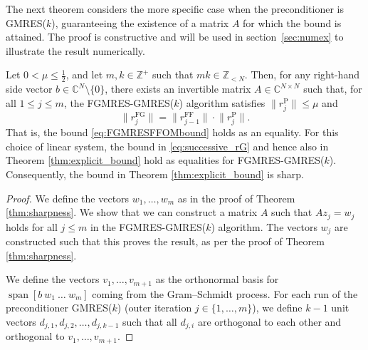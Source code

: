 \documentclass{siamart251216}
\DeclareMathOperator{\spn}{span}
\def\C{\mathbb{C}}
\def\Z{\mathbb{Z}}
\begin{document}
{The next theorem considers the more specific case when the preconditioner is GMRES($k$), guaranteeing the existence of a matrix $A$ for which the bound is attained. The proof is constructive and will be used in section~\ref{sec:numex} to illustrate the result numerically.

\begin{theorem}  \label{thm:sharpness_gmres}
    Let $0 < \mu \leq \frac{1}{2}$, and let $m,k \in \Z^+$ such that $mk \in \Z_{<N}$. Then, for any right-hand side vector $b \in \C^N \setminus \{0\}$, there exists an invertible matrix $A \in \C^{N \times N}$ such that, for all $1 \leq j \leq m$, the FGMRES-GMRES($k$) algorithm satisfies $\|r_j^{\mathrm{P}}\| \leq \mu$ and $$\big\| r_j^{\mathrm{FG}} \big\| = \big\| r_{j-1}^{\mathrm{FF}} \big\| \cdot \big\| r_{j}^{\mathrm{P}} \big\|.$$ 
    That is, the bound \eqref{eq:FGMRESFFOMbound} holds as an equality. For this choice of linear system, the bound in \eqref{eq:successive_rG} and hence also in Theorem \ref{thm:explicit_bound} hold as equalities for FGMRES-GMRES($k$). Consequently, the bound in Theorem \ref{thm:explicit_bound} is sharp.
\end{theorem}
\begin{proof}
    We define the vectors $w_1, \dots, w_m$ as in the proof of Theorem \ref{thm:sharpness}.
    We show that we can construct a matrix $A$ such that $A z_j = w_j$ holds for all $j \leq m$ in the FGMRES-GMRES($k$) algorithm. The vectors $w_j$ are constructed such that this proves the result, as per the proof of Theorem \ref{thm:sharpness}.

    We define the vectors $v_1, \dots, v_{m+1}$ as the orthonormal basis for $\spn [b \ w_1 \ \dots \ w_m]$ coming from the Gram–Schmidt process. For each run of the preconditioner GMRES($k$) (outer iteration $j \in \{1, \dots, m\}$), we define $k-1$ unit vectors $d_{j,1}, d_{j,2}, \dots, d_{j,k-1}$ such that all $d_{j,i}$ are orthogonal to each other and orthogonal to  $v_1, \dots, v_{m+1}$.


\end{proof}}
\end{document}
